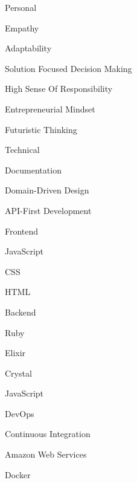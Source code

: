 \documentclass[]{awesome-cv}
\begin{document}
\begin{cventries}
	\cventry
	{}
	{Personal}
	{}
	{}
	{\begin{cvitems}
		\item {Empathy}
		\item {Adaptability}
		\item {Solution Focused Decision Making}
		\item {High Sense Of Responsibility}
		\item {Entrepreneurial Mindset}
		\item {Futuristic Thinking}
	\end{cvitems}}
	
	\vspace{-2mm}
	\cventry
	{}
	{Technical}
	{}
	{}
	{\begin{cvitems}
		\item {Documentation}
		\item {Domain-Driven Design}
		\item {API-First Development}
	\end{cvitems}}	

	\vspace{-2mm}
	\cventry
	{}
	{Frontend}
	{}
	{}
	{\begin{cvitems}
		\item {JavaScript}
		\item {CSS}
		\item {HTML}
	\end{cvitems}}
	
	\vspace{-2mm}
	\cventry
	{}
	{Backend}
	{}
	{}
	{\begin{cvitems}
		\item {Ruby}
		\item {Elixir}
		\item {Crystal}
		\item {JavaScript}
	\end{cvitems}}
	
	\vspace{-2mm}
	\cventry
	{}
	{DevOps}
	{}
	{}
	{\begin{cvitems}
		\item {Continuous Integration}
		\item {Amazon Web Services}
		\item {Docker}
	\end{cvitems}}	
	
\end{cventries}

\newpage
\end{document}
